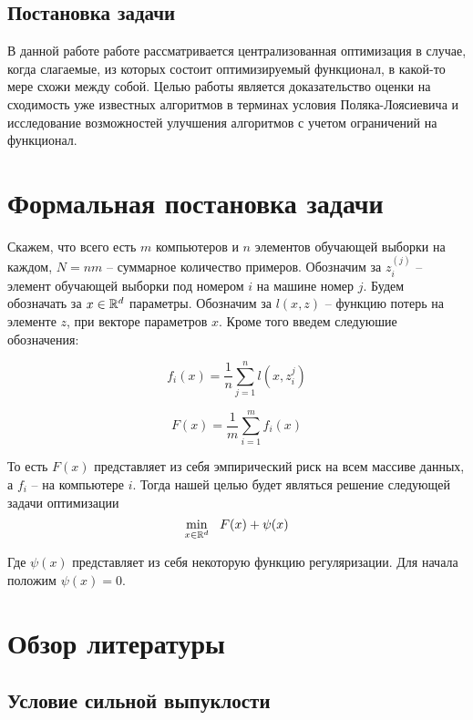 \documentclass[a4paper,12pt]{extarticle}
\begin{document}
\subsection{Постановка задачи}
В данной работе работе рассматривается централизованная оптимизация в случае, когда слагаемые,
из которых состоит оптимизируемый функционал, в какой-то мере схожи между собой.
Целью работы является доказательство оценки на сходимость уже известных алгоритмов в терминах условия Поляка-Лоясиевича
и исследование возможностей улучшения алгоритмов с учетом ограничений на функционал. 


\section{Формальная постановка задачи}

Скажем, что всего есть $m$ компьютеров и $n$ элементов обучающей выборки на каждом, $N = nm$ -- суммарное количество примеров.
Обозначим за $z_i^{(j)}$ -- элемент обучающей выборки под номером $i$ на машине номер $j$. Будем обозначать за $x\in\mathbb{R}^d$ параметры.
Обозначим за  $l(x, z)$ -- функцию потерь на элементе $z$, при векторе параметров $x$. Кроме того введем следуюшие обозначения:

\begin{equation}
    \label{eq:f_i}
         f_i(x) = \frac{1}{n} \sum_{j=1}^{n} l(x, z_i^j)
\end{equation}

\begin{equation}
    \label{eq:F}
         F(x) = \frac{1}{m} \sum_{i=1}^{m} f_i(x)
\end{equation}

То есть $F(x)$ представляет из себя эмпирический риск на всем массиве данных, а $f_i$ -- на компьютере $i$.
Тогда нашей целью будет являться решение следующей задачи оптимизации
\begin{equation}
    \label{eq:opt_x}
         \min_{x\in\mathbb{R}^d}~~ F(x)+\psi(x)
\end{equation}


Где $\psi(x)$ представляет из себя некоторую функцию регуляризации. Для начала положим $\psi(x) = 0$. 



\section{Обзор литературы}
\subsection{Условие сильной выпуклости}
\end{document}
